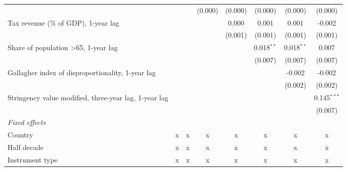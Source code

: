 \begin{tabular}{lccccccc}
                                                                  &                &               & (0.000)       & (0.000)       & (0.000)        & (0.000)        & (0.000)\\   
   Tax revenue (\% of GDP), 1-year lag                            &                &               &               & 0.000         & 0.001          & 0.001          & -0.002\\   
                                                                  &                &               &               & (0.001)       & (0.001)        & (0.001)        & (0.001)\\   
   Share of population >65, 1-year lag                            &                &               &               &               & 0.018$^{**}$   & 0.018$^{**}$   & 0.007\\   
                                                                  &                &               &               &               & (0.007)        & (0.007)        & (0.007)\\   
   Gallagher index of disproportionality, 1-year lag              &                &               &               &               &                & -0.002         & -0.002\\   
                                                                  &                &               &               &               &                & (0.002)        & (0.002)\\   
   Stringency value modified, three-year lag, 1-year lag          &                &               &               &               &                &                & 0.145$^{***}$\\   
                                                                  &                &               &               &               &                &                & (0.007)\\   
   \emph{Fixed effects}\\
   Country                                                        & x              & x             & x             & x             & x              & x              & x\\  
   Half decade                                                    & x              & x             & x             & x             & x              & x              & x\\  
   Instrument type                                                & x              & x             & x             & x             & x              & x              & x\\  

\end{tabular}
